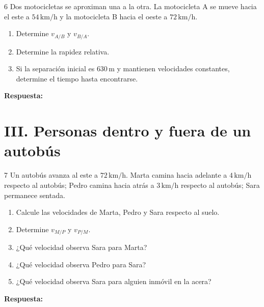 \documentclass[11pt,letterpaper]{article}
\newcommand{\espacio}[1]{\par\vspace{#1}\par}
\newcommand{\renglon}{\par\textcolor{morado}{\bfseries Respuesta:}\ \dotfill\par}
\begin{document}
\newpage
\begin{problema}{6}
Dos motocicletas se aproximan una a la otra. La motocicleta A se mueve hacia el este a $54\,\mathrm{km/h}$ y la motocicleta B hacia el oeste a $72\,\mathrm{km/h}$.
\begin{enumerate}[label=\alph*)]
\item Determine $v_{A/B}$ y $v_{B/A}$.
\item Determine la rapidez relativa.
\item Si la separación inicial es $630\,\mathrm{m}$ y mantienen velocidades constantes, determine el tiempo hasta encontrarse.
\end{enumerate}
\espacio{4.5cm}\renglon
\end{problema}
\clearpage
\section*{III. Personas dentro y fuera de un autobús}
\begin{problema}{7}
Un autobús avanza al este a $72\,\mathrm{km/h}$. Marta camina hacia adelante a $4\,\mathrm{km/h}$ respecto al autobús; Pedro camina hacia atrás a $3\,\mathrm{km/h}$ respecto al autobús; Sara permanece sentada.
\begin{center}\end{center}
\begin{enumerate}[label=\alph*)]
\item Calcule las velocidades de Marta, Pedro y Sara respecto al suelo.
\item Determine $v_{M/P}$ y $v_{P/M}$.
\item ¿Qué velocidad observa Sara para Marta?
\item ¿Qué velocidad observa Pedro para Sara?
\item ¿Qué velocidad observa Sara para alguien inmóvil en la acera?
\end{enumerate}
\espacio{5cm}\renglon
\end{problema}
\end{document}
